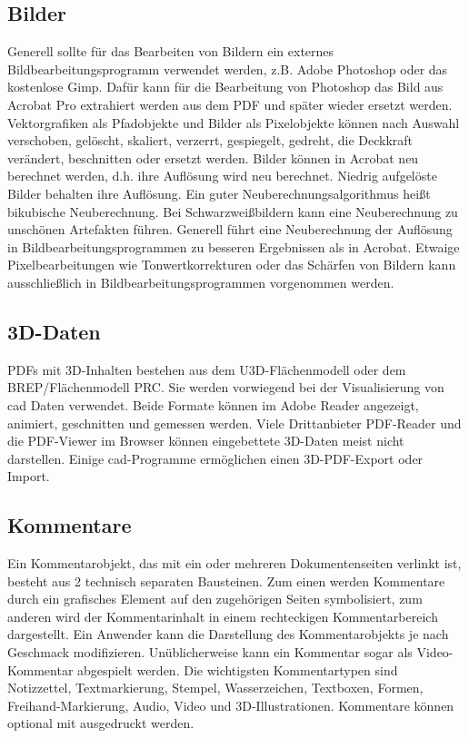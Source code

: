 \subsection{Bilder}
Generell sollte für das Bearbeiten von Bildern ein externes Bildbearbeitungsprogramm verwendet werden, z.B. Adobe Photoshop oder das kostenlose Gimp. Dafür kann für die Bearbeitung von Photoshop das Bild aus Acrobat Pro extrahiert werden aus dem PDF und später wieder ersetzt werden. Vektorgrafiken als Pfadobjekte und Bilder als Pixelobjekte können nach Auswahl verschoben, gelöscht, skaliert, verzerrt, gespiegelt, gedreht, die Deckkraft verändert, beschnitten oder ersetzt werden. \cite{schneeberger} Bilder können in Acrobat neu berechnet werden, d.h. ihre Auflösung wird neu berechnet. Niedrig aufgelöste Bilder behalten ihre Auflösung. Ein guter Neuberechnungsalgorithmus heißt bikubische Neuberechnung. Bei Schwarzweißbildern kann eine Neuberechnung zu unschönen Artefakten führen. \cite{buehler} Generell führt eine Neuberechnung der Auflösung in Bildbearbeitungsprogrammen zu besseren Ergebnissen als in Acrobat. Etwaige Pixelbearbeitungen wie Tonwertkorrekturen oder das Schärfen von Bildern kann ausschließlich in Bildbearbeitungsprogrammen vorgenommen werden. 

\subsection{3D-Daten}
PDFs mit 3D-Inhalten bestehen aus dem U3D-Flächenmodell oder dem BREP/Flächenmodell PRC. Sie werden vorwiegend bei der Visualisierung von \gls{cad} Daten verwendet. Beide Formate können im Adobe Reader angezeigt, animiert, geschnitten und gemessen werden. Viele Drittanbieter PDF-Reader und die PDF-Viewer im Browser können eingebettete 3D-Daten meist nicht darstellen. Einige \gls{cad}-Programme ermöglichen einen 3D-PDF-Export oder Import. \cite{wiki-pdf-de}

\subsection{Kommentare}
Ein Kommentarobjekt, das mit ein oder mehreren Dokumentenseiten verlinkt ist, besteht aus 2 technisch separaten Bausteinen. Zum einen werden Kommentare durch ein grafisches Element auf den zugehörigen Seiten symbolisiert, zum anderen wird der Kommentarinhalt in einem rechteckigen Kommentarbereich dargestellt. Ein Anwender kann die Darstellung des Kommentarobjekts je nach Geschmack modifizieren. Unüblicherweise kann ein Kommentar sogar als Video-Kommentar abgespielt werden. Die wichtigsten Kommentartypen sind Notizzettel, Textmarkierung, Stempel, Wasserzeichen, Textboxen, Formen, Freihand-Markierung, Audio, Video und 3D-Illustrationen. Kommentare können optional mit ausgedruckt werden. \cite{softx}

